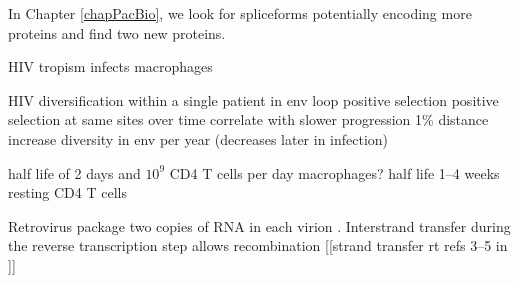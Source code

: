 \documentclass[../sherrill-Mix_thesis.tex]{subfiles}
\begin{document}
	In Chapter \ref{chapPacBio}, we look for spliceforms potentially encoding more proteins and find two new proteins.


	HIV tropism infects macrophages \citep{Koenig1986}






	HIV diversification within a single patient in env loop \citep{Holmes1992} positive selection \citep{Bonhoeffer1995,Ross2002} positive selection at same sites over time correlate with slower progression \citep{Wolinsky1996,Ross2002} 1\% distance increase diversity in env per year (decreases later in infection) \citep{Shankarappa1999}


	half life of 2 days and $10^9$ CD4 T cells per day \citep{Ho1995,Wei1995,Perelson1997}
	macrophages? half life 1--4 weeks \citep{Perelson1997,Lambotte2000,Zhu2002} 
	resting CD4 T cells\citep{Finzi1997,Chun1997,Wong1997}

	Retrovirus package two copies of RNA in each virion \citep{Bellamy1974,Kung1975,Kung1976}. Interstrand transfer during the reverse transcription step allows recombination \citep{Panganiban1988,Hu1990,Hu1990a}
	[[strand transfer rt refs 3--5 in \citep{Panganiban1988}]]
\end{document}

